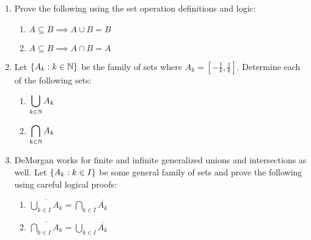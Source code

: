 \documentclass[letterpaper,12pt,fleqn]{article}
\begin{document}
\begin{enumerate}[left=0in,itemsep=0.5in]
\item Prove the following using the set operation definitions and logic:
  \begin{enumerate}
  \item \(A\subseteq B\implies A\cup B=B\)
  \item \(A\subseteq B\implies A\cap B=A\)
  \end{enumerate}

\item Let \(\{A_k:k\in\mathbb{N}\}\) be the family of sets where \(A_k=\left[-\frac{1}{k},\frac{1}{k}\right]\).
  Determine each of the following sets:
  \begin{enumerate}
    \item \(\displaystyle\bigcup_{k\in\mathbb{N}}A_k\)
    \item \(\displaystyle\bigcap_{k\in\mathbb{N}}A_k\)
  \end{enumerate}

\item DeMorgan works for finite and infinite generalized unions and intersections as well.  Let
  \(\{A_k:k\in I\}\) be some general family of sets and prove the following using careful logical proofs:
  \begin{enumerate}
  \item \(\displaystyle\overline{\bigcup_{k\in I}A_k}=\bigcap_{k\in I}\overline{A_k}\)
  \item \(\displaystyle\overline{\bigcap_{k\in I}A_k}=\bigcup_{k\in I}\overline{A_k}\)
  \end{enumerate}
\end{enumerate}
\end{document}
